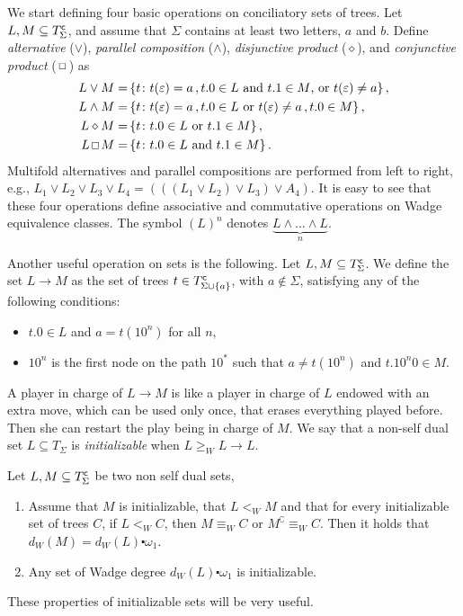 We start defining four basic operations on conciliatory sets of trees. Let $L, M \subseteq T^{\sf c}_\Sigma$, and assume that $\Sigma$ contains at least two letters, $a$ and $b$. Define
{\em alternative} ($\lor$), {\em parallel composition}  ($\land$), {\em disjunctive product} ($\diamond$), and {\em
conjunctive product} ($\textrm{{\scriptsize $\,\Box\,$}}$) as
\begin{align*}
L \lor M = \,&\{t\colon t(\varepsilon) = a\,, t.0 \in L \text{ and } t.1 \in M \textrm{, or } t(\varepsilon) \neq a\}\,,\\
L \land M = \,&\{t\colon t(\varepsilon) = a\,, t.0 \in L \textrm{ or } t(\varepsilon) \neq a\,, t.0 \in M\}\,,\\
L \diamond M =\, &\{t\colon  t.0 \in L \textrm{ or } t.1 \in M\}\,,\\
L \textrm{{\scriptsize $\,\Box\,$}} M =\, &\{t\colon t.0 \in L \textrm{ and } t.1 \in M\}\,.
\end{align*}
Multifold alternatives and parallel compositions are performed from left to right, e.g.,  $L_1 \lor L_2 \lor L_3 \lor L_4 = (((L_1 \lor L_2) \lor L_3) \lor A_4 )$. It is easy to see that these four operations define associative and commutative operations on Wadge equivalence classes. The symbol $(L)^n$ denotes $\underbrace{L \land \ldots \land L}_{n}$.\label{automatapower}



Another useful operation on sets is the following. Let $L, M \subseteq T^{\sf c}_\Sigma$. We define
 the set $L \to M$ as the set of trees $t \in T^{\sf c}_{\Sigma\cup \{a\}}$, with $a \notin \Sigma$, satisfying any of the following conditions:

\begin{itemize}
\item $t.0 \in L$ and $a = t(10^n)$ for all $n$,
\item $10^{n}$ is the first node on the path $10^*$ such that $a \neq t(10^{n})$ and $t.10^{n}0 \in M$.
\end{itemize}
A player in charge of $L \to M$ is like a player in charge of $L$ endowed with an extra move, which can be used only once, that erases everything played before. Then she can restart the play being in charge of $M$.  We say that  a non-self dual set $L\subseteq T_\Sigma$ is \emph{initializable} when $L \geq_W L \to L$.


\begin{proposition}\label{p_2a}
Let $L, M\subseteq T^{\sf c}_\Sigma$ be two non self dual sets, 
\begin{enumerate}
\item Assume that $M$ is initializable, that $L <_W M $ and that for every initializable set of trees $C$, if $L<_WC$, then $M \equiv_W C$ or $M^\complement \equiv_W C$. Then it holds that  $d_W(M)=d_W(L)\centerdot \omega_1$.
\item Any set of Wadge degree $d_W(L)\centerdot \omega_1$ is initializable.
\end{enumerate}
\end{proposition}
These properties of initializable sets will be very useful.

